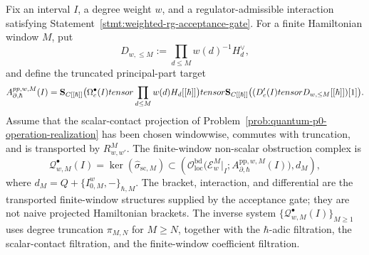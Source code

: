 \begin{defn}
\label{defn:wt-nonscalar-qme-tower}
  Fix an interval \(I\), a degree weight \(w\), and a
  regulator-admissible interaction satisfying
  Statement~\ref{stmt:weighted-rg-acceptance-gate}.  For a finite
  Hamiltonian window \(M\), put
  \[
    D_{w,\leq M}:=\prod_{d\leq M}w(d)^{-1}H_d^\vee,
  \]
  and define the truncated principal-part target
  \[
  \begin{aligned}
    A_{\partial,\hbar}^{pp,w,M}(I)
      =
      \mathbf S_{C[[\hbar]]}
      \bigl(\Omega^\bullet_c(I)tensor\prod_{d\leq M}w(d)H_d[[\hbar]]\bigr)
      tensor
      \mathbf S_{C[[\hbar]]}
      \bigl((D'_c(I)tensor
        D_{w,\leq M}[[\hbar]])[1]\bigr).
  \end{aligned}
  \]
  Assume that the scalar-contact projection of
  Problem~\ref{prob:quantum-p0-operation-realization} has been chosen
  windowwise, commutes with truncation, and is transported by
  \(R^M_{w,w'}\).  The finite-window non-scalar obstruction complex is
  \[
    \mathcal Q^\bullet_{w,M}(I)
      =
      \ker(\widehat\sigma_{\mathrm{sc},M})
      \subset
      \left(
        \mathcal O_{\mathrm{loc}}^{\mathrm{bd}}\bigl(
          \mathcal E_w^M|_I;
          A_{\partial,\hbar}^{\mathrm{pp},w,M}(I)\bigr),
        d_M
      \right),
  \]
  where
  \(d_M=Q+\{I^w_{0,M},-\}_{\hbar,M}\).  The bracket, interaction, and
  differential are the transported finite-window structures supplied by
  the acceptance gate; they are not naive projected Hamiltonian brackets.
  The inverse system
  \(\{\mathcal Q^\bullet_{w,M}(I)\}_{M\geq1}\) uses degree truncation
  \(\pi_{M,N}\) for \(M\geq N\), together with the \(\hbar\)-adic
  filtration, the scalar-contact filtration, and the finite-window
  coefficient filtration.
\end{defn}

